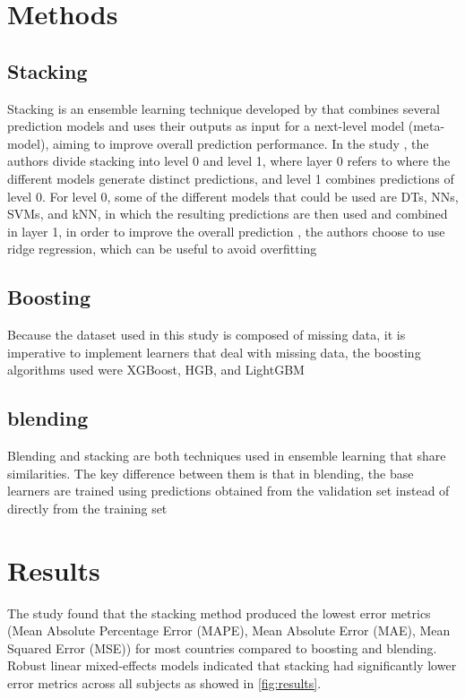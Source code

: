 \documentclass[final,5p,times,twocolumn,authoryear]{elsarticle}
\begin{document}
\section{Methods}

\subsection{Stacking}
Stacking is an ensemble learning technique developed by \cite{WOLPERT1992241} that combines several prediction models and uses their outputs as input for a next-level model (meta-model), aiming to improve overall prediction performance\cite{Stacking}. In the study \cite{Stacking}, the authors divide stacking into level 0 and level 1, where layer 0 refers to where the different models generate distinct predictions, and level 1 combines predictions of level 0. For level 0, some of the different models that could be used are DTs, NNs, SVMs, and kNN, in which the resulting predictions are then used and combined in layer 1, in order to improve the overall prediction \cite{WOLPERT1992241}, the authors choose to use ridge regression, which can be useful to avoid overfitting \cite{CUI2021107038}
\subsection{Boosting}
Because the dataset used in this study is composed of missing data, it is imperative to implement learners that deal with missing data, the boosting algorithms used were XGBoost, HGB, and LightGBM \cite{Stacking}
\subsection{blending}
Blending and stacking are both techniques used in ensemble learning that share similarities. The key difference between them is that in blending, the base learners are trained using predictions obtained from the validation set instead of directly from the training set\cite{Stacking}
\section{Results}
The study found that the stacking method produced the lowest error metrics (Mean Absolute Percentage Error (MAPE), Mean Absolute Error (MAE), Mean Squared Error (MSE)) for most countries compared to boosting and blending. Robust linear mixed-effects models indicated that stacking had significantly lower error metrics across all subjects as showed in \ref{fig:results}.
\end{document}
